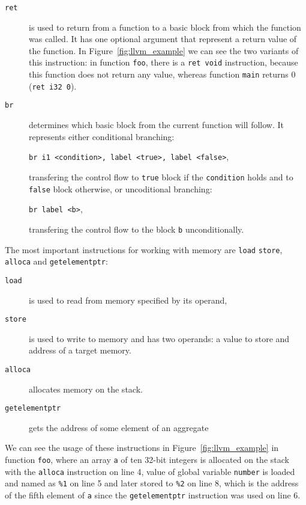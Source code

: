 \begin{description}
\item[\texttt{ret}] is used to return from a function to a basic block
from which the function was called. It has one optional argument that represent
a return value of the function. In Figure~\ref{fig:llvm_example} we can see the
two variants of this instruction: in function \texttt{foo}, there is a
\texttt{ret void} instruction, because this function does not return any value,
whereas function \texttt{main} returns 0 (\texttt{ret i32 0}).

\item[\texttt{br}] determines which basic block from the current function
will follow. It represents either conditional branching:

\texttt{br i1 <condition>, label <true>, label <false>},

transfering the control flow to \texttt{true} block if the \texttt{condition} holds and to
\texttt{false} block otherwise, or uncoditional branching:

\texttt{br label <b>},

transfering the control flow to the block \texttt{b} unconditionally.
\end{description}

The most important instructions for working with memory are \texttt{load}
\texttt{store}, \texttt{alloca} and \texttt{getelementptr}:
\begin{description}
\item[\texttt{load}] is used to read from memory specified by its operand,
\item[\texttt{store}] is used to write to memory and has two operands: a value
to store and address of a target memory.
\item[\texttt{alloca}] allocates memory on the stack.
\item[\texttt{getelementptr}] gets the address of some element of an aggregate
\end{description}
We can see the usage of these instructions in Figure~\ref{fig:llvm_example} in
function \texttt{foo}, where an array \texttt{a} of ten 32-bit integers is
allocated on the stack with the \texttt{alloca} instruction on line 4, value of
global variable \texttt{number} is loaded and named as \texttt{\%1} on line 5
and later stored to \texttt{\%2} on line 8, which is the address of the fifth
element of \texttt{a} since the \texttt{getelementptr} instruction was used on
line 6.

